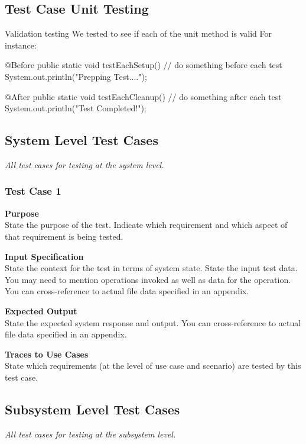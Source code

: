 \documentclass[12pt]{article}
\begin{document}
\subsection{Test Case Unit Testing}
Validation testing
We tested to see if each of the unit method is valid
For instance:

  @Before
  public static void testEachSetup() {
    // do something before each test
    System.out.println("Prepping Test....");
  }
  
  @After
  public static void testEachCleanup() {
    // do something after each test
    System.out.println("Test Completed!");
  }

\subsection{System Level Test Cases}

{\it
All test cases for testing at the system level.
}

\subsubsection{Test Case 1} \label{tc:1}

\noindent
{\bf Purpose}\\
State the purpose of the test.
Indicate which requirement and which aspect of that requirement is being tested.

\noindent
{\bf Input Specification}\\
State the context for the test in terms of system state.
State the input test data. You may need to mention operations invoked as well as data for the operation.
You can cross-reference to actual file data specified in an appendix.

\noindent
{\bf Expected Output}\\
State the expected system response and output.
You can cross-reference to actual file data specified in an appendix.

\noindent
{\bf Traces to Use Cases}\\
State which requirements (at the level of use case and scenario) are tested by this test case.

\subsection{Subsystem Level Test Cases}

{\it
All test cases for testing at the subsystem level.
}
\end{document}
